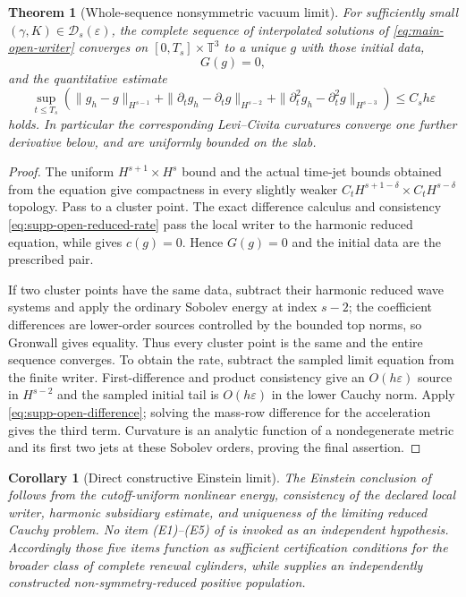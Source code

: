 \documentclass[11pt]{article}
\newtheorem{theorem}{Theorem}[section]
\newtheorem{corollary}[corollary]{Corollary}
\theoremstyle{definition}
\theoremstyle{remark}
\begin{document}
\begin{theorem}[Whole-sequence nonsymmetric vacuum limit]
\label{thm:supp-open-einstein}
For sufficiently small $(\gamma,K)\in\mathcal D_s(\varepsilon)$, the complete
sequence of interpolated solutions of \eqref{eq:main-open-writer} converges on
$[0,T_s]\times\mathbb T^3$ to a unique $g$ with those initial data,
\begin{equation}
 \boxed{G(g)=0,}
 \label{eq:supp-open-vacuum}
\end{equation}
and the quantitative estimate
\begin{equation}
 \sup_{t\le T_s}\left(
 \|g_h-g\|_{H^{s-1}}+\|\partial_tg_h-\partial_tg\|_{H^{s-2}}
 +\|\partial_t^2g_h-\partial_t^2g\|_{H^{s-3}}
 \right)\le C_sh\varepsilon
 \label{eq:supp-open-metric-rate}
\end{equation}
holds.  In particular the corresponding Levi--Civita curvatures converge one
further derivative below, and are uniformly bounded on the slab.
\end{theorem}
\begin{proof}
The uniform $H^{s+1}\times H^s$ bound and the actual time-jet bounds obtained
from the equation give compactness in every slightly weaker
$C_tH^{s+1-\delta}\times C_tH^{s-\delta}$ topology.  Pass to a cluster point.
The exact difference calculus and consistency
\eqref{eq:supp-open-reduced-rate} pass the local writer to the harmonic
reduced equation, while  gives $c(g)=0$.
Hence $G(g)=0$ and the initial data are the prescribed pair.

If two cluster points have the same data, subtract their harmonic reduced
wave systems and apply the ordinary Sobolev energy at index $s-2$; the
coefficient differences are lower-order sources controlled by the bounded top
norms, so Gronwall gives equality.  Thus every cluster point is the same and
the entire sequence converges.  To obtain the rate, subtract the sampled
limit equation from the finite writer.  First-difference and product
consistency give an $O(h\varepsilon)$ source in $H^{s-2}$ and the sampled
initial tail is $O(h\varepsilon)$ in the lower Cauchy norm.  Apply
\eqref{eq:supp-open-difference}; solving the mass-row difference for the
acceleration gives the third term.  Curvature is an analytic function of a
nondegenerate metric and its first two jets at these Sobolev orders, proving
the final assertion.
\end{proof}

\begin{corollary}[Direct constructive Einstein limit]
\label{cor:supp-open-direct-route}
The Einstein conclusion of  follows from the
cutoff-uniform nonlinear energy, consistency of the declared local writer,
harmonic subsidiary estimate, and uniqueness of the limiting reduced Cauchy
problem.  No item \textup{(E1)--(E5)} of
 is invoked as an independent hypothesis.
Accordingly those five items function as sufficient certification conditions
for the broader class of complete renewal cylinders, while
 supplies an independently constructed
non-symmetry-reduced positive population.
\end{corollary}
\end{document}
